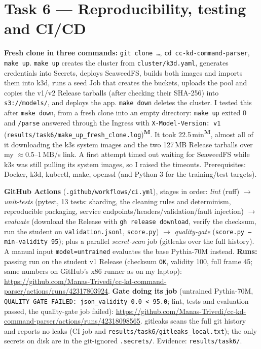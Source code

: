 \documentclass[10pt,a4paper]{article}
\newcommand{\code}[1]{\texttt{\small #1}}
\newcommand{\meas}{\textsuperscript{\textbf{M}}}
\begin{document}
\section{Task 6 --- Reproducibility, testing and CI/CD}
\textbf{Fresh clone in three commands:} \code{git clone \ldots}, \code{cd cc-kd-command-parser}, \code{make up}.
\code{make up} creates the cluster from \code{cluster/k3d.yaml}, generates credentials into Secrets, deploys SeaweedFS, builds both
images and imports them into k3d, runs a seed Job that creates the buckets, uploads the pool and copies the
v1/v2 Release tarballs (after checking their SHA-256) into \code{s3://models/}, and deploys the app.
\code{make down} deletes the cluster. I tested this after \code{make down}, from a fresh
clone into an empty directory: \code{make up} exited 0 and \code{/parse} answered through the Ingress with
\code{X-Model-Version: v1} (\code{results/task6/make\_up\_fresh\_clone.log})\meas{}. It took 22.5\,min\meas{}, almost all
of it downloading the k3s system images and the two 127\,MB Release tarballs over my $\approx$0.5--1\,MB/s link. A first
attempt timed out waiting for SeaweedFS while k3s was still pulling its system images, so I raised the timeouts.
Prerequisites: Docker, k3d, kubectl, make, openssl (and Python 3 for the training/test targets).

\textbf{GitHub Actions} (\code{.github/workflows/ci.yml}), stages in order: \emph{lint} (ruff) $\to$
\emph{unit-tests} (pytest, 13 tests: sharding, the cleaning rules and determinism, reproducible packaging,
service endpoints/headers/validation/fault injection) $\to$ \emph{evaluate} (download the Release with
\code{gh release download}, verify the checksum, run the student on \code{validation.jsonl}, \code{score.py})
$\to$ \emph{quality-gate} (\code{score.py --min-validity 95}); plus a parallel \emph{secret-scan} job (gitleaks over
the full history). A manual input \code{model=untrained} evaluates the base Pythia-70M instead.
\textbf{Runs:} passing run on the student v1 Release (checksum \code{OK}, validity 100, full frame 45; same
numbers on GitHub's x86 runner as on my laptop):
\url{https://github.com/Manas-Trivedi/cc-kd-command-parser/actions/runs/42317803924}.
\textbf{Gate doing its job} (untrained Pythia-70M, \code{QUALITY GATE FAILED: json\_validity 0.0 < 95.0}; lint,
tests and evaluation passed, the quality-gate job failed):
\url{https://github.com/Manas-Trivedi/cc-kd-command-parser/actions/runs/42318098565}.
gitleaks scans the full git history and reports no leaks (CI job and \code{results/task6/gitleaks\_local.txt}); the
only secrets on disk are in the git-ignored \code{.secrets/}. Evidence: \code{results/task6/}.
\end{document}
